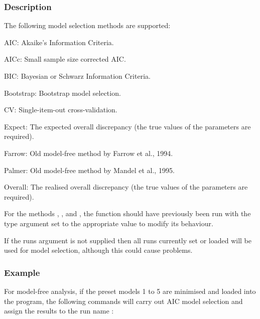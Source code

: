   

  
 \subsubsection{Description} 

 The following model selection methods are supported: 
  

 AIC:  Akaike's Information Criteria. 
  

 AICc:  Small sample size corrected AIC. 
  

 BIC:  Bayesian or Schwarz Information Criteria. 
  

 Bootstrap:  Bootstrap model selection. 
  

 CV:  Single-item-out cross-validation. 
  

 Expect:  The expected overall discrepancy (the true values of the parameters are required). 
  

 Farrow:  Old model-free method by Farrow et al., 1994. 
  

 Palmer:  Old model-free method by Mandel et al., 1995. 
  

 Overall:  The realised overall discrepancy (the true values of the parameters are required). 
  

 For the methods , , and , the function  should have previously been run with the type argument set to the appropriate value to modify its behaviour. 
  

 If the runs argument is not supplied then all runs currently set or loaded will be used for model selection, although this could cause problems. 
  

  
 \subsubsection{Example} 

 For model-free analysis, if the preset models 1 to 5 are minimised and loaded into the program, the following commands will carry out AIC model selection and assign the results to the run name : 
  




